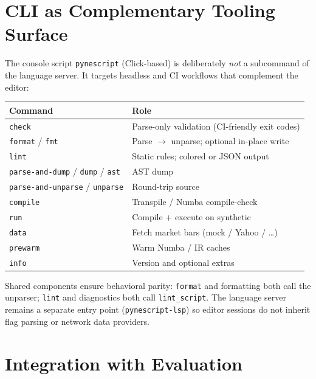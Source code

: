\documentclass[11pt,a4paper]{article}
\begin{document}
\section{CLI as Complementary Tooling Surface}
\label{sec:cli}

The console script \texttt{pynescript} (Click-based) is deliberately \emph{not} a
subcommand of the language server. It targets headless and CI workflows that
complement the editor:

\begin{center}
\small
\begin{tabular}{@{}ll@{}}
\toprule
Command & Role \\
\midrule
\texttt{check} & Parse-only validation (CI-friendly exit codes) \\
\texttt{format} / \texttt{fmt} & Parse \(\rightarrow\) unparse; optional in-place write \\
\texttt{lint} & Static rules; colored or JSON output \\
\texttt{parse-and-dump} / \texttt{dump} / \texttt{ast} & AST dump \\
\texttt{parse-and-unparse} / \texttt{unparse} & Round-trip source \\
\texttt{compile} & Transpile / Numba compile-check \\
\texttt{run} & Compile + execute on synthetic \ohlcv{} \\
\texttt{data} & Fetch market bars (mock / Yahoo / \ldots) \\
\texttt{prewarm} & Warm Numba / IR caches \\
\texttt{info} & Version and optional extras \\
\bottomrule
\end{tabular}
\end{center}

Shared components ensure behavioral parity: \cli{} \texttt{format} and \lsp{} formatting
both call the unparser; \cli{} \texttt{lint} and \lsp{} diagnostics both call
\texttt{lint\_script}. The language server remains a separate entry point
(\texttt{pynescript-lsp}) so editor sessions do not inherit \cli{} flag parsing or
network data providers.

\section{Integration with Evaluation}
\label{sec:eval}
\end{document}
